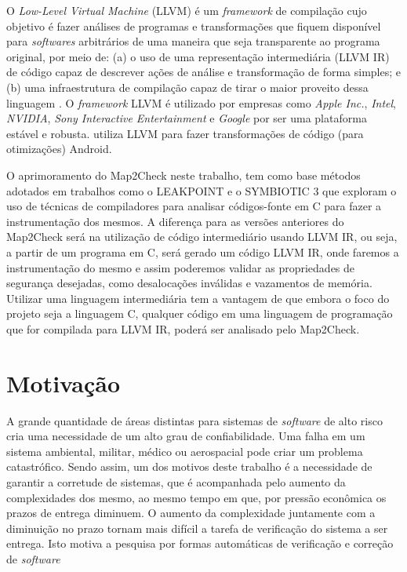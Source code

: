 \par
O \textit{Low-Level Virtual Machine} (LLVM) é um \textit{framework} de compilação cujo objetivo é fazer análises de programas e transformações que fiquem disponível para \textit{softwares} arbitrários de uma maneira que seja transparente ao programa original, por meio de: (a) o uso de uma representação intermediária (LLVM IR) de código capaz de descrever ações de análise e transformação de forma simples; e (b) uma infraestrutura de compilação capaz de tirar o maior proveito dessa linguagem \cite{Lattner:2004}. O \textit{framework} LLVM é utilizado por empresas como \textit{Apple Inc.}, \textit{Intel}, \textit{NVIDIA}, \textit{Sony Interactive Entertainment} \cite{LLVM:2009} e \textit{Google} \cite{LLVM:2011} por ser uma plataforma estável e robusta.  utiliza LLVM para fazer transformações de código (para otimizações) Android.

\par
O aprimoramento do Map2Check \cite{Rocha:2015} neste trabalho, tem como base métodos adotados em trabalhos como o LEAKPOINT \cite{Clause:2010} e o SYMBIOTIC 3 \cite{Chalupa:2016} 
que exploram o uso de técnicas de compiladores para analisar códigos-fonte 
em C para fazer a instrumentação dos mesmos. A diferença para as versões 
anteriores do Map2Check será na utilização de código intermediário usando LLVM IR, ou seja, a partir de um programa em C, será gerado um código LLVM IR, onde
faremos a instrumentação do mesmo e assim poderemos validar as
propriedades de segurança desejadas, como desalocações inválidas e vazamentos de memória. Utilizar uma linguagem intermediária tem a vantagem de que embora o foco do projeto seja a linguagem C, qualquer código em uma linguagem de programação que for compilada para LLVM IR, poderá ser
analisado pelo Map2Check.


\section{Motivação}

A grande quantidade de áreas distintas para sistemas de \textit{software} de alto risco cria uma necessidade de um alto grau de confiabilidade. Uma falha em um sistema ambiental, militar, médico ou aerospacial pode criar um problema catastrófico. Sendo assim, um dos motivos deste trabalho é a necessidade de garantir a corretude de sistemas, que é acompanhada  pelo aumento da complexidades dos mesmo, ao mesmo tempo em que, por pressão econômica os prazos de entrega diminuem. O aumento da complexidade juntamente com a diminuição no prazo tornam mais difícil a tarefa de verificação do sistema a ser entrega. Isto motiva a pesquisa por formas automáticas de verificação e correção de \textit{software} \cite{dsilva:2008}

